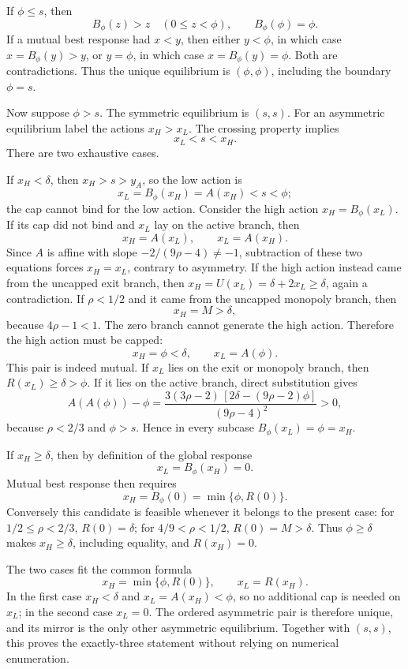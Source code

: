 If \(\phi\le s\), then
\[
B_\phi(z)>z\quad(0\le z<\phi),
\qquad
B_\phi(\phi)=\phi.
\]
If a mutual best response had \(x<y\), then either
\(y<\phi\), in which case \(x=B_\phi(y)>y\), or
\(y=\phi\), in which case \(x=B_\phi(y)=\phi\).  Both are
contradictions.  Thus the unique equilibrium is \((\phi,\phi)\), including
the boundary \(\phi=s\).

Now suppose \(\phi>s\).  The symmetric equilibrium is \((s,s)\).  For an
asymmetric equilibrium label the actions \(x_H>x_L\).  The crossing property
implies
\[
x_L<s<x_H.
\]
There are two exhaustive cases.

If \(x_H<\delta\), then \(x_H>s>y_A\), so the low action is
\[
x_L=B_\phi(x_H)=A(x_H)<s<\phi;
\]
the cap cannot bind for the low action.  Consider the high action
\(x_H=B_\phi(x_L)\).  If its cap did not bind and \(x_L\) lay on the
active branch, then
\[
x_H=A(x_L),\qquad x_L=A(x_H).
\]
Since \(A\) is affine with slope \(-2/(9\rho-4)\ne-1\), subtraction of
these two equations forces \(x_H=x_L\), contrary to asymmetry.  If the high
action instead came from the uncapped exit branch, then
\(x_H=U(x_L)=\delta+2x_L\ge\delta\), again a contradiction.  If
\(\rho<1/2\) and it came from the uncapped monopoly branch, then
\[
x_H=M>\delta,
\]
because \(4\rho-1<1\).  The zero branch cannot generate the high action.
Therefore the high action must be capped:
\[
x_H=\phi<\delta,
\qquad
x_L=A(\phi).
\]
This pair is indeed mutual.  If \(x_L\) lies on the exit or monopoly branch,
then \(R(x_L)\ge\delta>\phi\).  If it lies on the active branch, direct
substitution gives
\[
A(A(\phi))-\phi
=
\frac{
3(3\rho-2)\,[2\delta-(9\rho-2)\phi]
}{(9\rho-4)^2}
>0,
\]
because \(\rho<2/3\) and \(\phi>s\).  Hence in every subcase
\(B_\phi(x_L)=\phi=x_H\).

If \(x_H\ge\delta\), then by definition of the global response
\[
x_L=B_\phi(x_H)=0.
\]
Mutual best response then requires
\[
x_H=B_\phi(0)=\min\{\phi,R(0)\}.
\]
Conversely this candidate is feasible whenever it belongs to the present case:
for \(1/2\le\rho<2/3\), \(R(0)=\delta\); for
\(4/9<\rho<1/2\), \(R(0)=M>\delta\).  Thus
\(\phi\ge\delta\) makes \(x_H\ge\delta\), including equality, and
\(R(x_H)=0\).

The two cases fit the common formula
\[
x_H=\min\{\phi,R(0)\},
\qquad
x_L=R(x_H).
\]
In the first case \(x_H<\delta\) and \(x_L=A(x_H)<\phi\), so no
additional cap is needed on \(x_L\); in the second case \(x_L=0\).
The ordered asymmetric pair is therefore unique, and its mirror is the only
other asymmetric equilibrium.  Together with \((s,s)\), this proves the
exactly-three statement without relying on numerical enumeration.

